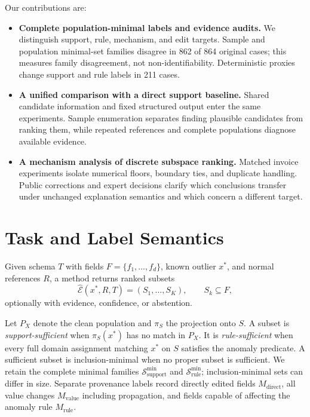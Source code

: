 \documentclass[conference]{IEEEtran}
\begin{document}
Our contributions are:
\begin{itemize}
\item \textbf{Complete population-minimal labels and evidence audits.} We distinguish support, rule, mechanism, and edit targets. Sample and population minimal-set families disagree in 862 of 864 original cases; this measures family disagreement, not non-identifiability. Deterministic proxies change support and rule labels in 211 cases.
\item \textbf{A unified comparison with a direct support baseline.} Shared candidate information and fixed structured output enter the same experiments. Sample enumeration separates finding plausible candidates from ranking them, while repeated references and complete populations diagnose available evidence.
\item \textbf{A mechanism analysis of discrete subspace ranking.} Matched invoice experiments isolate numerical floors, boundary ties, and duplicate handling. Public corrections and expert decisions clarify which conclusions transfer under unchanged explanation semantics and which concern a different target.
\end{itemize}



\section{Task and Label Semantics}

Given schema $T$ with fields $F=\{f_1,\ldots,f_d\}$, known outlier $x^*$, and normal references $R$, a method returns ranked subsets
\[
\widehat{\mathcal E}(x^*,R,T)=(S_1,\ldots,S_K),\qquad S_k\subseteq F,
\]
optionally with evidence, confidence, or abstention.

Let $P_X$ denote the clean population and $\pi_S$ the projection onto $S$. A subset is \emph{support-sufficient} when $\pi_S(x^*)$ has no match in $P_X$. It is \emph{rule-sufficient} when every full domain assignment matching $x^*$ on $S$ satisfies the anomaly predicate. A sufficient subset is inclusion-minimal when no proper subset is sufficient. We retain the complete minimal families $\mathcal S_{\mathrm{support}}^{\min}$ and $\mathcal S_{\mathrm{rule}}^{\min}$; inclusion-minimal sets can differ in size. Separate provenance labels record directly edited fields $M_{\mathrm{direct}}$, all value changes $M_{\mathrm{value}}$ including propagation, and fields capable of affecting the anomaly rule $M_{\mathrm{rule}}$.
\end{document}
